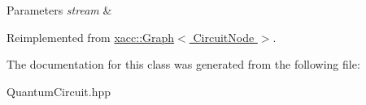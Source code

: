 \begin{DoxyParams}{Parameters}
{\em stream} & \\
\hline
\end{DoxyParams}


Reimplemented from \hyperlink{a00044_abdd3e67dc08c223821d809bc8914164a}{xacc\+::\+Graph$<$ Circuit\+Node $>$}.



The documentation for this class was generated from the following file\+:\begin{DoxyCompactItemize}
\item 
Quantum\+Circuit.\+hpp\end{DoxyCompactItemize}
